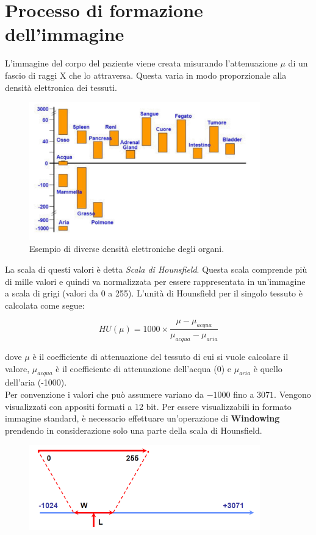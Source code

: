 \section{Processo di formazione dell'immagine}

L'immagine del corpo del paziente viene creata misurando
l'attenuazione $\mu$ di un fascio di raggi X che lo attraversa. Questa
varia in modo proporzionale alla densità elettronica dei tessuti.

\begin{figure}[H]
    \centering
    \includegraphics[width=10cm, keepaspectratio]{capitoli/immagini/imgs/ossascala.png}
    \caption{Esempio di diverse densità elettroniche degli organi.}
\end{figure}

La scala di questi valori è detta \textit{Scala di Hounsfield}.
Questa scala comprende più di mille valori e quindi va normalizzata per
essere rappresentata in un'immagine a scala di grigi (valori da 0 a 255).
L'unità di Hounsfield per il singolo tessuto è calcolata come segue:

$$
    HU(\mu) = 1000 \times \frac{\mu - \mu_{acqua}}{\mu_{acqua} - \mu_{aria}}
$$

dove $\mu$ è il coefficiente di attenuazione del tessuto di cui si vuole calcolare il valore,
$\mu_{acqua}$ è il coefficiente di attenuazione dell'acqua (0) e $\mu_{aria}$ è
quello dell'aria (-1000).\\

Per convenzione i valori che può assumere variano da $-1000$ fino a $3071$. Vengono
visualizzati con appositi formati a 12 bit. Per essere visualizzabili in formato
immagine standard, è necessario effettuare un'operazione di \textbf{Windowing} prendendo in
considerazione solo una parte della scala di Hounsfield.

\begin{figure}[H]
    \centering
    \includegraphics[width=10cm, keepaspectratio]{capitoli/immagini/imgs/hunsfield.png}
\end{figure}


